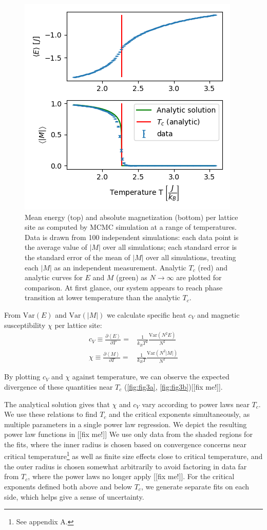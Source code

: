 \documentclass[letter,scriptaddress,twocolumn, prl,nofootinbib]{revtex4}
\newcommand{\submin}[1]{\left\langle #1 \right\rangle}
\newcommand{\Var}[1]{\text{Var}\left( #1 \right)}
\begin{document}
\begin{figure}[h]
	\begin{center}
		\includegraphics[width=.5\textwidth]{figs/fig2_EMplots.png}
		\caption{Mean energy (top) and absolute magnetization (bottom) per lattice site as computed by MCMC simulation at a range of temperatures. Data is drawn from 100 independent simulations: each data point is the average value of $|M|$ over all simulations; each standard error is the standard error of the mean of $|M|$ over all simulations, treating each $|M|$ as an independent measurement. Analytic $T_c$ (red) and analytic curves for $E$ and $M$ (green) as $N\rightarrow\infty$ are plotted for comparison. At first glance, our system appears to reach phase transition at lower temperature than the analytic $T_c$.}
		\label{fig:fig2}
	\end{center}
\end{figure}

From $\Var{E}$ and $\Var{|M|}$ we calculate specific heat $c_V$ and magnetic susceptibility $\chi$ per lattice site:
\begin{align}
	c_V \equiv \frac{\partial \submin{E}}{\partial T} = & \frac{1}{k_BT^2}\frac{\Var{N^2 E}}{N^2} \label{eq:cv} \\
	\chi \equiv \frac{\partial \submin{M}}{\partial T} = & \frac{1}{k_BT}\frac{\Var{N^2 |M|}}{N^2}	\label{eq:chi}
\end{align}


By plotting $c_V$ and $\chi$ against temperature, we can observe the expected divergence of these quantities near $T_c$ (\autoref{fig:fig3a}, \autoref{fig:fig3b})[[fix me!]].

The analytical solution gives that $\chi$ and $c_V$ vary according to power laws near $T_c$. We use these relations to find $T_c$ and the critical exponents simultaneously, as multiple parameters in a single power law regression. We depict the resulting power law functions in [[fix me!]] %
We use only data from the shaded regions for the fits, where the inner radius is chosen based on convergence concerns near critical temperature\footnote{See appendix A.} as well as finite size effects close to critical temperature, and the outer radius is chosen somewhat arbitrarily to avoid factoring in data far from $T_c$, where the power laws no longer apply [[fix me!]]. For the critical exponents defined both above and below $T_c$, we generate separate fits on each side, which helps give a sense of uncertainty. %
\end{document}
